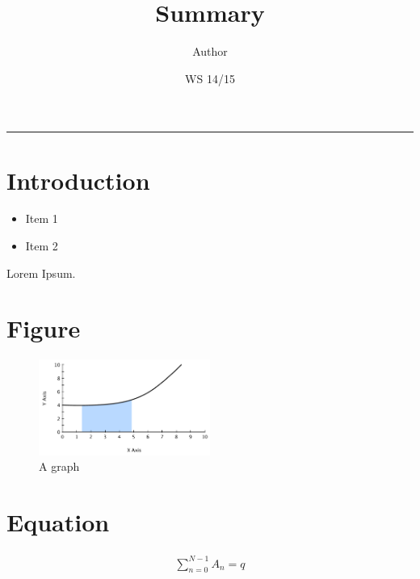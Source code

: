 \documentclass[10pt, oneside]{article}   	%
\title{Summary}
\author{Author}
\date{WS 14/15}							%
\begin{document}
\twocolumn
\maketitle
\tableofcontents
\noindent\rule{0.5\textwidth}{0.5pt}

\section{Introduction}
\begin{itemize}
	\item Item 1
	\item Item 2
\end{itemize}
Lorem Ipsum.

\section{Figure}
\begin{figure}[h!]
	\includegraphics[width=0.5\textwidth]{figures/graph}
	\caption{A graph}
\end{figure}

\section{Equation}
\begin{align}
	\sum_{n=0}^{N-1} A_n = q
\end{align}
\end{document}
